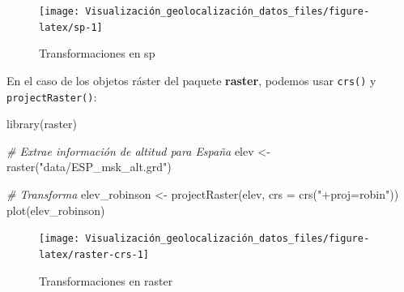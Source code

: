 \documentclass[
]{report}
\newenvironment{Shaded}{\begin{snugshade}}{\end{snugshade}}
\newcommand{\AttributeTok}[1]{\textcolor[rgb]{0.77,0.63,0.00}{#1}}
\newcommand{\CommentTok}[1]{\textcolor[rgb]{0.56,0.35,0.01}{\textit{#1}}}
\newcommand{\FunctionTok}[1]{\textcolor[rgb]{0.00,0.00,0.00}{#1}}
\newcommand{\NormalTok}[1]{#1}
\newcommand{\OtherTok}[1]{\textcolor[rgb]{0.56,0.35,0.01}{#1}}
\newcommand{\StringTok}[1]{\textcolor[rgb]{0.31,0.60,0.02}{#1}}
\theoremstyle{definition}
\theoremstyle{definition}
\theoremstyle{definition}
\theoremstyle{definition}
\theoremstyle{remark}
\begin{document}
\begin{Shaded}
\end{Shaded}

\begin{figure}

{\centering \texttt{[image: Visualización\_geolocalización\_datos\_files/figure-latex/sp-1]} 

}

\caption{Transformaciones en sp}\label{fig:sp}
\end{figure}

En el caso de los objetos ráster del paquete \textbf{raster}, podemos usar \texttt{crs()} y
\texttt{projectRaster()}:

\begin{Shaded}
\begin{Highlighting}[]
\FunctionTok{library}\NormalTok{(raster)}


\CommentTok{\# Extrae información de altitud para España}
\NormalTok{elev }\OtherTok{\textless{}{-}} \FunctionTok{raster}\NormalTok{(}\StringTok{"data/ESP\_msk\_alt.grd"}\NormalTok{)}


\CommentTok{\# Transforma}
\NormalTok{elev\_robinson }\OtherTok{\textless{}{-}} \FunctionTok{projectRaster}\NormalTok{(elev, }\AttributeTok{crs =} \FunctionTok{crs}\NormalTok{(}\StringTok{"+proj=robin"}\NormalTok{))}
\FunctionTok{plot}\NormalTok{(elev\_robinson)}
\end{Highlighting}
\end{Shaded}

\begin{figure}

{\centering \texttt{[image: Visualización\_geolocalización\_datos\_files/figure-latex/raster-crs-1]} 

}

\caption{Transformaciones en raster}\label{fig:raster-crs}
\end{figure}
\end{document}
